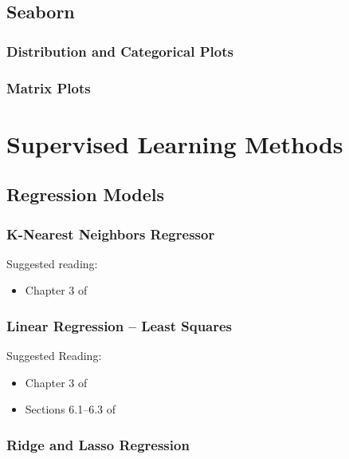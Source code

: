 \documentclass[11pt]{article}
\theoremstyle{plain}
\theoremstyle{definition}
\begin{document}
\vspace{1cm}

\subsection{Seaborn}

\subsubsection{Distribution and Categorical Plots}

\subsubsection{Matrix Plots}

\newpage 

\section{Supervised Learning Methods}

\subsection{Regression Models}

\subsubsection{K-Nearest Neighbors Regressor}

Suggested reading:

\begin{itemize}
\item Chapter 3 of \cite{wilmott}
\end{itemize}

\subsubsection{Linear Regression -- Least Squares}

Suggested Reading:

\begin{itemize}
\item Chapter 3 of \cite{ISLR}
\item Sections 6.1--6.3 of \cite{wilmott}
\end{itemize}

\subsubsection{Ridge and Lasso Regression}
\end{document}
